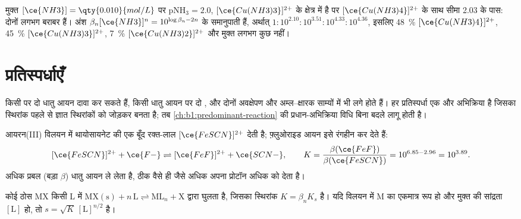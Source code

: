 \begin{example}\label{ex:b1:complexation:cu}
मुक्त $[\ce{NH3}] = \qty{0.010}{mol/L}$ पर $\mathrm{pNH_3} = 2.0$,
$[\ce{Cu(NH3)3}]^{2+}$ के क्षेत्र में है पर
$[\ce{Cu(NH3)4}]^{2+}$ के साथ सीमा 2.03 के पास: दोनों लगभग बराबर हैं। अंश
$\beta_n[\ce{NH3}]^n = 10^{\log\beta_n - 2n}$ के समानुपाती हैं, अर्थात्
$1 : 10^{2.10} : 10^{3.51} : 10^{4.33} : 10^{4.36}$, इसलिए \qty{48}{\percent}
$[\ce{Cu(NH3)4}]^{2+}$, \qty{45}{\percent} $[\ce{Cu(NH3)3}]^{2+}$,
\qty{7}{\percent} $[\ce{Cu(NH3)2}]^{2+}$ और मुक्त  लगभग कुछ नहीं।
\end{example}

\section{प्रतिस्पर्धाएँ}

किसी  पर दो धातु आयन दावा कर सकते हैं, किसी धातु आयन पर दो ,
और दोनों अवक्षेपण और अम्ल--क्षारक साम्यों में भी लगे होते हैं।
हर प्रतिस्पर्धा एक और अभिक्रिया है जिसका स्थिरांक पहले से ज्ञात
स्थिरांकों को जोड़कर बनता है; तब \cref{ch:b1:predominant-reaction} की
प्रधान-अभिक्रिया विधि बिना बदले लागू होती है।

\begin{example}\label{ex:b1:complexation:scn-f}
आयरन(III) विलयन में थायोसायनेट की एक बूँद रक्त-लाल
$[\ce{FeSCN}]^{2+}$ देती है; फ़्लुओराइड आयन इसे रंगहीन कर देते हैं:
\[
  [\ce{FeSCN}]^{2+} + \ce{F-} \rightleftharpoons [\ce{FeF}]^{2+} + \ce{SCN-},
  \qquad K = \frac{\beta(\ce{FeF})}{\beta(\ce{FeSCN})} = 10^{6.85 - 2.96} =
  10^{3.89} .
\]
अधिक प्रबल  (बड़ा $\beta$) धातु आयन ले लेता है, ठीक वैसे ही जैसे
अधिक  अपना प्रोटॉन अधिक  को देता है।
\end{example}

\begin{proposition}[संकुलन बनाम अवक्षेपण]\label{prop:b1:complexation:competition-precipitation}
कोई ठोस MX किसी  L में
$\mathrm{MX(s)} + n\,\mathrm{L} \rightleftharpoons \mathrm{ML}_n + \mathrm{X}$ द्वारा घुलता है,
जिसका स्थिरांक $K = \beta_n K_s$ है। यदि विलयन में M का एकमात्र रूप  हो
और मुक्त  की सांद्रता $[\mathrm{L}]$ हो, तो
 $s = \sqrt{K}\,[\mathrm{L}]^{n/2}$ है।
\end{proposition}

